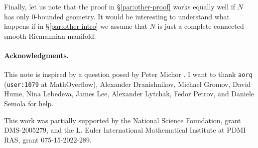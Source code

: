 \arxiv{\documentclass[a4paper,10pt]{article}}{\documentclass{mjm}}
\begin{document}
Finally, let us note that the proof in §\ref{par:other-proof} works equally well if $N$ has only 0-bounded geometry. 
It would be interesting to understand what happens if in §\ref{par:other-intro} we assume that $N$ is just a complete connected smooth Riemannian manifold. 

\paragraph{Acknowledgments.} 
This note is inspired by a question posed by Peter Michor \cite{124840}.
I want to thank 
\texttt{aorq} (\texttt{user:1079} at MathOverflow),
Alexander Dranishnikov,
Michael Gromov,
David Hume,
Nina Lebedeva,
James Lee,
Alexander Lytchak, 
Fedor Petrov,
and
Daniele Semola
for help.

This work was partially supported by the National Science Foundation, grant DMS-2005279,
and the L. Euler International Mathematical Institute at PDMI RAS, grant 075-15-2022-289.


{\sloppy
\def\emph{\textit}
\printbibliography[heading=bibintoc]
\fussy
}
\end{document}
